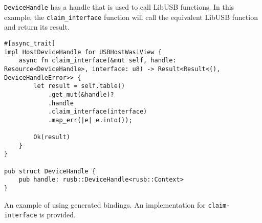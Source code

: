 \texttt{DeviceHandle} has a handle that is used to call LibUSB functions. In this example, the \texttt{claim\_interface} function will call the equivalent LibUSB function and return its result.\\

\begin{code}
\begin{verbatim}
#[async_trait]
impl HostDeviceHandle for USBHostWasiView {
	async fn claim_interface(&mut self, handle: Resource<DeviceHandle>, interface: u8) -> Result<Result<(), DeviceHandleError>> {
		let result = self.table()
			.get_mut(&handle)?
			.handle
			.claim_interface(interface)
			.map_err(|e| e.into());
	
		Ok(result)
	}
}

pub struct DeviceHandle {
	pub handle: rusb::DeviceHandle<rusb::Context>
}
\end{verbatim} 
\caption{An example of using generated bindings. An implementation for \texttt{claim-interface} is provided.}
\label{code:conforming_example}
\end{code}

